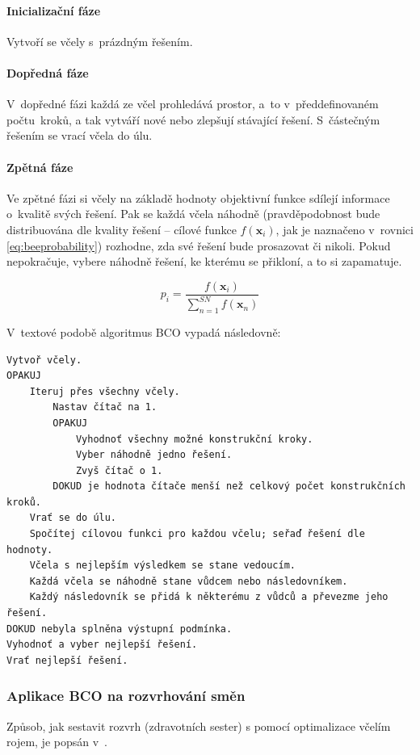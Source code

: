 \documentclass[twoside]{ctuthesis}
\begin{document}
\begin{enumerate}[label=\textbf{O\arabic*.}]
\paragraph{Inicializační fáze} Vytvoří se včely s~prázdným řešením.

\paragraph{Dopředná fáze} V~dopředné fázi každá ze včel prohledává prostor, a~to v~předdefinovaném počtu~kroků, a tak vytváří nové nebo zlepšují stávající řešení. S~částečným řešením se vrací včela do úlu.

\paragraph{Zpětná fáze} Ve zpětné fázi si včely na základě hodnoty objektivní funkce sdílejí informace o~kvalitě svých řešení. Pak se každá včela náhodně (prav\-dě\-po\-dob\-nost bude distribuována dle kvality řešení -- cílové funkce $f(\boldsymbol{x}_i)$, jak je naznačeno v~rovnici \ref{eq:beeprobability}) rozhodne, zda své řešení bude prosazovat či nikoli. Pokud nepokračuje, vybere náhodně řešení, ke kterému se přikloní, a to si zapamatuje. \cite{teodorovic2009bee}

\begin{equation}
	\label{eq:beeprobability}
	p_i = \frac{f(\boldsymbol{x}_i)}{\sum_{n = 1}^{SN} f(\boldsymbol{x}_n)}
\end{equation}

V~textové podobě algoritmus BCO vypadá následovně:
\begin{lstlisting}[caption={Pseudokód pro BCO}]
Vytvoř včely.
OPAKUJ
	Iteruj přes všechny včely.
		Nastav čítač na 1.
		OPAKUJ
			Vyhodnoť všechny možné konstrukční kroky.
			Vyber náhodně jedno řešení.
			Zvyš čítač o 1.
		DOKUD je hodnota čítače menší než celkový počet konstrukčních kroků.
	Vrať se do úlu.
	Spočítej cílovou funkci pro každou včelu; seřaď řešení dle hodnoty.
	Včela s nejlepším výsledkem se stane vedoucím.
	Každá včela se náhodně stane vůdcem nebo následovníkem.
	Každý následovník se přidá k některému z vůdců a převezme jeho řešení.
DOKUD nebyla splněna výstupní podmínka.
Vyhodnoť a vyber nejlepší řešení.
Vrať nejlepší řešení.
\end{lstlisting}

\subsubsection{Aplikace BCO na rozvrhování směn}
\label{sub:bconrp}
Způsob, jak sestavit rozvrh (zdravotních sester) s pomocí optimalizace včelím rojem, je popsán v~\cite{todorovic2012bee}.


\end{enumerate}
\end{document}
